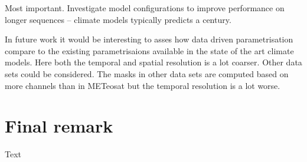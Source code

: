 Most important. Investigate model configurations to improve performance on longer sequences -- climate models typically predicts a century.

In future work it would be interesting to asses how data driven parametrisation compare to the existing parametrisaions available in the state of the art climate models. Here both the temporal and spatial resolution is a lot coarser. Other data sets could be considered. The masks in other data sets are computed based on more channels than in METeosat but the temporal resolution is a lot worse. 



\section{Final remark}
Text
